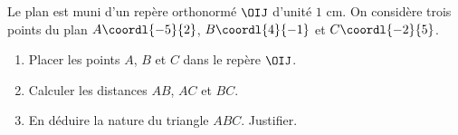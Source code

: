 \begin{exo}
	Le plan est muni d'un repère orthonormé $\OIJ$ d'unité $1\text{ cm}$. On considère trois points du plan $A\coordl{-5}{2}$, $B\coordl{4}{-1}$ et $C\coordl{-2}{5}$.
	\begin{enumerate}
		\item Placer les points $A$, $B$ et $C$ dans le repère $\OIJ$.
		\item Calculer les distances $AB$, $AC$ et $BC$.
		\item En déduire la nature du triangle $ABC$. Justifier.
	\end{enumerate}
\end{exo}

